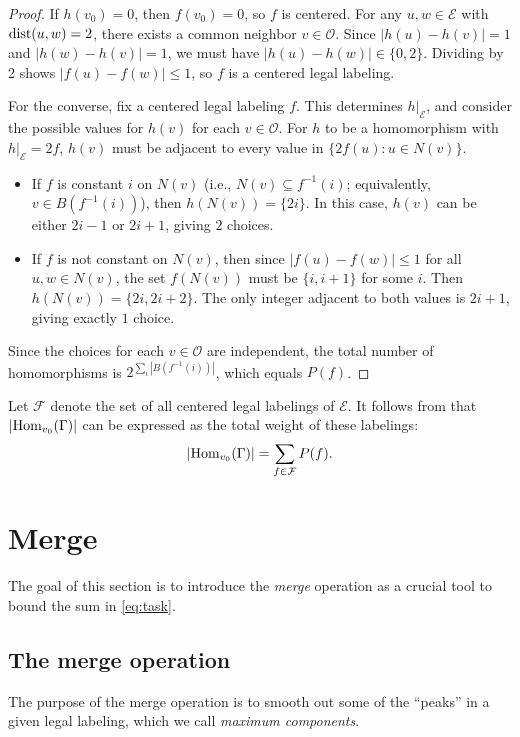 \documentclass{amsart}
\theoremstyle{definition}
\newcommand{\cO}{\mathcal{O} }
\newcommand{\cE}{\mathcal{E} }
\newcommand{\beq}[1]{\begin{equation}\label{#1}}
\newcommand{\enq}[0]{\end{equation}}
\newcommand{\0}[0]{\emptyset}
\newcommand{\Hom}[0]{\mbox{\rm{Hom}}}
\newcommand{\dist}[0]{\mbox{\rm{dist}}}
\begin{document}
\begin{proof}
    If $h(v_0)=0$, then $f(v_0)=0$, so $f$ is centered. For any $u, w \in \cE$ with $\dist(u, w)=2$, there exists a common neighbor $v \in \cO$. Since $|h(u)-h(v)|=1$ and $|h(w)-h(v)|=1$, we must have $|h(u)-h(w)| \in \{0, 2\}$. Dividing by 2 shows $|f(u)-f(w)| \le 1$, so $f$ is a centered legal labeling.

    For the converse, fix a centered legal labeling $f$. This determines $h|_\cE$, and consider the possible values for $h(v)$ for each $v \in \cO$. For $h$ to be a homomorphism with $h|_{\cE}=2f$, $h(v)$ must be adjacent to every value in $\{2f(u) : u \in N(v)\}$. 
    \begin{itemize}
        \item If $f$ is constant $i$ on $N(v)$ (i.e., $N(v) \subseteq f^{-1}(i)$; equivalently, $v \in B(f^{-1}(i))$), then $h(N(v)) = \{2i\}$. In this case, $h(v)$ can be either $2i-1$ or $2i+1$, giving $2$ choices.
        \item If $f$ is not constant on $N(v)$, then since $|f(u)-f(w)| \le 1$ for all $u, w \in N(v)$, the set $f(N(v))$ must be $\{i, i+1\}$ for some $i$. Then $h(N(v)) = \{2i, 2i+2\}$. The only integer adjacent to both values is $2i+1$, giving exactly $1$ choice.
    \end{itemize}
    Since the choices for each $v \in \cO$ are independent, the total number of homomorphisms is $2^{\sum_{i} |B(f^{-1}(i))|}$, which equals $P(f)$.
\end{proof}

Let $\mathcal{F}$ denote the set of all centered legal labelings of $\cE$. It follows from  that $|\Hom_{v_0}(\Gamma)|$ can be expressed as the total weight of these labelings:
\beq{eq:task} 
|\Hom_{v_0}(\Gamma)| = \sum_{f \in \mathcal{F}} P(f).
\enq

\section{Merge}\label{sec:merge}

The goal of this section is to introduce the \textit{merge} operation as a crucial tool to bound the sum in \eqref{eq:task}.

\subsection{The merge operation}

The purpose of the merge operation is to smooth out some of the ``peaks'' in a given legal labeling, which we call \textit{maximum components}.
\end{document}
